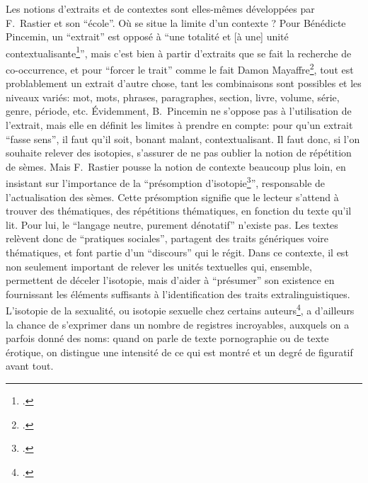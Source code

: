 Les notions d'extraits et de contextes sont elles-mêmes développées par F.~Rastier et son \enquote{école}. Où se situe la limite d'un contexte ? Pour Bénédicte Pincemin, un \enquote{extrait} est opposé à \enquote{une totalité et [à une] unité contextualisante\footcite{pincemin1999semantique}}, mais c'est bien à partir d'extraits que se fait la recherche de co-occurrence, et pour \enquote{forcer le trait} comme le fait Damon Mayaffre\footcite{mayaffre2008occurrence}, tout est problablement un extrait d'autre chose, tant les combinaisons sont possibles et les niveaux variés: mot, mots, phrases, paragraphes, section, livre, volume, série, genre, période, etc. Évidemment, B.~Pincemin ne s'oppose pas à l'utilisation de l'extrait, mais elle en définit les limites à prendre en compte: pour qu'un extrait \enquote{fasse sens}, il faut qu'il soit, bonant malant, contextualisant. Il faut donc, si l'on souhaite relever des isotopies, s'assurer de ne pas oublier la notion de répétition de sèmes. Mais F.~Rastier pousse la notion de contexte beaucoup plus loin, en insistant sur l'importance de la \enquote{présomption d'isotopie\footcite{rastier_isotopie_1985}}, responsable de l'actualisation des sèmes. Cette présomption signifie que le lecteur s'attend à trouver des thématiques, des répétitions thématiques, en fonction du texte qu'il lit. Pour lui, le \enquote{langage neutre, purement dénotatif} n'existe pas. Les textes relèvent donc de \enquote{pratiques sociales}, partagent des traits génériques voire thématiques, et font partie d'un \enquote{discours} qui le régit. Dans ce contexte, il est non seulement important de relever les unités textuelles qui, ensemble, permettent de déceler l'isotopie, mais d'aider à \enquote{présumer} son existence en fournissant les éléments suffisants à l'identification des traits extralinguistiques.  L'isotopie de la sexualité, ou isotopie sexuelle chez certains auteurs\footcite{leon_semes_1976}, a d'ailleurs la chance de s'exprimer dans un nombre de registres incroyables, auxquels on a parfois donné des noms: quand on parle de texte pornographie ou de texte érotique, on distingue une intensité de ce qui est montré et un degré de figuratif avant tout.


